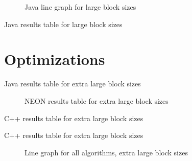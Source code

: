 \begin{figure}
    \centering
    
    \caption{Java line graph for large block sizes}
    \label{fig:java:line:large}
\end{figure}
\begin{table}
    \centering
    \caption{Java results table for large block sizes}
    \label{tab:java:large}
    
\end{table}





\section{Optimizations}

\begin{table}
    \centering
    \caption{Java results table for extra large block sizes}
    \label{tab:java:extra}
    
\end{table}

\begin{figure}
    \centering
    
    \caption{NEON results table for extra large block sizes}
    \label{fig:neon:line:extra}
\end{figure}

\begin{table}
    \centering
    
    \caption{C++ results table for extra large block sizes}
    \label{tab:cpp:extra}
\end{table}

\begin{table}
    \centering
    \resizebox{\columnwidth}{!}{
        
    }
    \caption{C++ results table for extra large block sizes}
    \label{tab:cpp:extra}
\end{table}

\begin{figure}
    \centering
    
    \caption{Line graph for all algorithms, extra large block sizes}
    \label{fig:all:line:extra}
\end{figure}

